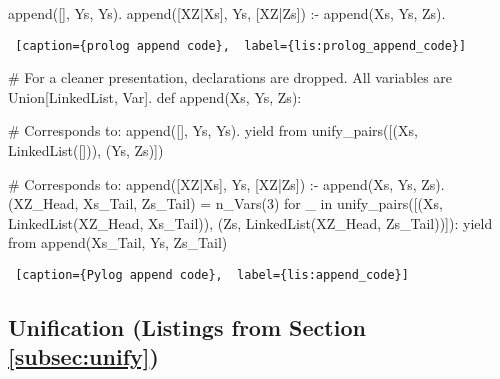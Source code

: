 \noindent
\begin{minipage}{\linewidth}  \largev 
\begin{python}
append([], Ys, Ys).
append([XZ|Xs], Ys, [XZ|Zs]) :- append(Xs, Ys, Zs).
\end{python}
\begin{lstlisting} [caption={prolog append code},  label={lis:prolog_append_code}]
\end{lstlisting}
\end{minipage}



\noindent
\begin{minipage}{\linewidth}  \largev 
\begin{python}[numbers=left]
# For a cleaner presentation, declarations are dropped. All variables are Union[LinkedList, Var].
def append(Xs, Ys, Zs):

  # Corresponds to: append([], Ys, Ys).
  yield from unify_pairs([(Xs, LinkedList([])), (Ys, Zs)])

  # Corresponds to: append([XZ|Xs], Ys, [XZ|Zs]) :- append(Xs, Ys, Zs).
  (XZ_Head, Xs_Tail, Zs_Tail) = n_Vars(3)
  for _ in unify_pairs([(Xs, LinkedList(XZ_Head, Xs_Tail)),
                       (Zs, LinkedList(XZ_Head, Zs_Tail))]):
    yield from append(Xs_Tail, Ys, Zs_Tail)

\end{python}
\begin{lstlisting} [caption={Pylog append code},  label={lis:append_code}]
\end{lstlisting}
\end{minipage}

\subsection{Unification (Listings from Section \ref{subsec:unify})} \label{appsubsec:unify}

